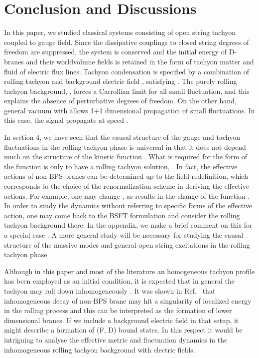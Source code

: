 \documentclass[a4paper,12pt]{article}
\begin{document}
\section{Conclusion and Discussions} 

In this paper, we studied classical systems consisting of open string
tachyon 
coupled to gauge field. Since the dissipative couplings to
closed string degrees of freedom are suppressed, the system is conserved 
and the initial energy of D-branes and their worldvolume fields is
retained in the form of tachyon matter and fluid of electric flux
lines. Tachyon condensation is specified by a combination of rolling
tachyon \coordHE{} and background electric field \coordHE{}, satisfying
\coordHE{}. The purely rolling tachyon background, \coordHE{},
forces a Carrollian limit for all small fluctuation, and this explains
the absence of perturbative degrees of freedom. On the other hand,
general 
vacuum with \coordHE{} allows 1+1 dimensional propagation of small
fluctuations.  In this case, the signal propagate at speed \coordHE{}.

In section 4, we have seen that the causal structure of the gauge and
tachyon fluctuations in the rolling tachyon phase is universal in that
it does not depend much on the structure of the kinetic
function \coordHE{}. What is required for the form of the function 
\coordHE{} is only to have a rolling tachyon solution, 
\coordHE{}. In fact, the effective actions of 
non-BPS branes can be determined up to the field redefinition, which
corresponds to the choice of the renormalization scheme in deriving the
effective actions. For example, one may change 
\coordHE{}, as results in the change of the
function \coordHE{} \cite{Muk}. 
In order to study the dynamics without 
referring to specific forms of the effective action, one may come back
to the BSFT formulation and consider the rolling tachyon background
there. In the appendix, we make a brief comment on this for a special
case \coordHE{}. A more general study will be necessary for studying the
causal structure of the massive modes and general open string
excitations in the rolling tachyon phase. 

Although in this paper and most of the literature an 
homogeneous tachyon profile has been employed as an initial condition, 
it is expected that in general the tachyon may roll down
inhomogeneously \cite{inhomo}.  It was shown in Ref.\ \cite{time} 
that inhomogeneous decay of non-BPS brane may hit a singularity of
localized energy in the
rolling process and this can be interpreted as the  formation of lower
dimensional branes. If we include a background electric field in
that setup, it might describe a formation of 
(F, D) bound states. In this respect it would be intriguing to analyse
the effective metric and fluctuation dynamics in the inhomogeneous
rolling tachyon background with electric fields. 
\end{document}
